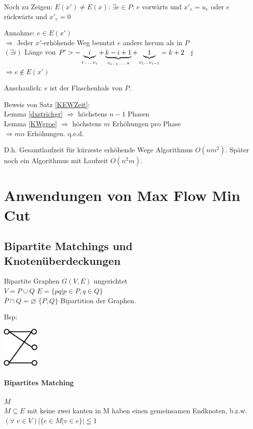 Noch zu Zeigen: $E(x') \neq E(x)$: $\exists e \in P$: $e$ vorwärts und $x'_{e} = u_{e}$ oder $e$ rückwärts und
$x'_{e} = 0$

Annahme: $e \in E(x')$\\
$\Rightarrow$ Jeder $x'$-erhöhende Weg benutzt $e$ anders herum als in
$P$\\
$ (\exists i)$ Länge von $P' > -\underbrace{i}_{\mbox{\scriptsize$r
\ldots v_{i}$}} + \underbrace{k-i+1}_{\mbox{\scriptsize $v_{i-1}\ldots s$}} +
 \underbrace{1}_{v_{i}\ldots v_{i-1}} = k+2 \hspace{3mm}\lightning$\\
$\Rightarrow e \not\in E(x')$

Anschaulich: $e$ ist der Flaschenhals von $P$.

Beweis von Satz \ref{KEWZeit}:\\
Lemma \ref{dxstrichgr} $\Rightarrow$ höchstens $n-1$ Phasen\\
Lemma \ref{KWgroe} $\Rightarrow$ höchstens $m$ Erhöhungen pro Phase\\
$\Rightarrow m n$ Erhöhungen. q.e.d.

D.h. Gesamtlaufzeit für kürzeste erhöhende Wege Algorithmus $O(n m^{2})$.
Später noch ein Algorithmus mit Laufzeit $O(n^{2}m)$.

\section{Anwendungen von Max Flow Min Cut}

\subsection{Bipartite Matchings und Knotenüberdeckungen}
Bipartite Graphen $G(V,E)$ ungerichtet\\
$V=P \cup Q$ \hspace{3mm} $E = \{p q| p \in P, q \in Q\}$\\
$P \cap Q = \varnothing$ \hspace{3mm} $\{P,Q\}$ Bipartition der Graphen.

Bsp:

\includegraphics[height=2cm]{bilder/3-0BipMatch}

\paragraph{Bipartites Matching} $M$\\
$M \subseteq E$ mit keine zwei kanten in M haben einen gemeinsamen
Endknoten, b.z.w. $(\forall \; v \in V) | \{ e \in M | v \in e\}| \leqq 1$

